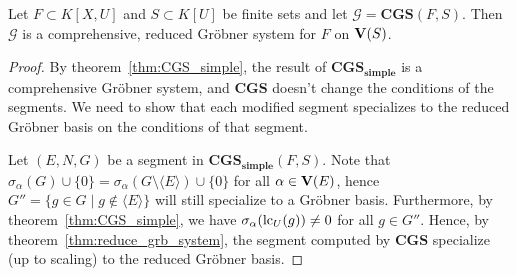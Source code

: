 \begin{theorem}\label{thm:CGS}
  Let $F \subset K[X, U]$ and $S \subset K[U]$ be finite sets and let $\mathcal G = \mathbf{CGS}(F, S)$. Then $\mathcal G$ is a comprehensive, reduced Gröbner system for $F$ on $\operatorname{\mathbf V}(S)$.
\end{theorem}
\begin{proof}
  By theorem~\ref{thm:CGS_simple}, the result of $\mathbf{CGS_{simple}}$ is a comprehensive Gröbner system, and $\mathbf{CGS}$ doesn't change the conditions of the segments. We need to show that each modified segment specializes to the reduced Gröbner basis on the conditions of that segment.

  Let $(E, N, G)$ be a segment in $\mathbf{CGS_{simple}}(F, S)$. Note that $\sigma_{\alpha}(G) \cup \{0\} = \sigma_{\alpha}(G \setminus \langle E \rangle) \cup \{0\}$ for all $\alpha \in \operatorname{\mathbf V}(E)$, hence $G'' = \{g \in G \mid g \notin \langle E \rangle\}$ will still specialize to a Gröbner basis. Furthermore, by theorem~\ref{thm:CGS_simple}, we have $\sigma_{\alpha}(\operatorname{lc}_{U}(g)) \neq 0$ for all $g \in G''$. Hence, by theorem~\ref{thm:reduce_grb_system}, the segment computed by $\mathbf{CGS}$ specialize (up to scaling) to the reduced Gröbner basis.
\end{proof}




